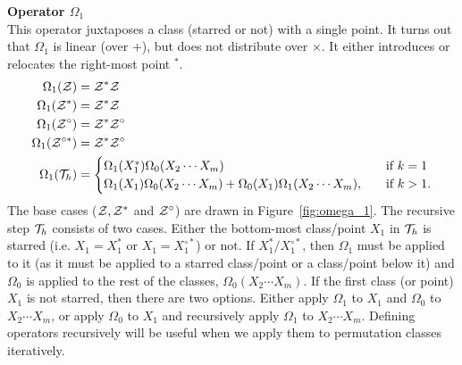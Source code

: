 \documentclass[12pt, a4paper, twoside]{report}
\begin{document}
\noindent\textbf{Operator $\Omega_1$}\\
This operator juxtaposes a class (starred or not) with a single point. It turns out that $\Omega_1$ is linear (over $+$), but does not distribute over $\times$. It either introduces or relocates the right-most point ${}^*$. 
\begin{align}
\begin{aligned}
    \Omega_1(\mathcal{Z}) &= \mathcal{Z}^*\mathcal{Z}\\
    \Omega_1(\mathcal{Z}^*) &= \mathcal{Z}^*\mathcal{Z}\\
    \Omega_1(\mathcal{Z}^\circ) &= \mathcal{Z}^*\mathcal{Z}^\circ\\
    \Omega_1(\mathcal{Z}^{\circ*}) &= \mathcal{Z}^*\mathcal{Z}^\circ\\
  \Omega_1(\mathcal{T}_h) &=
                      \begin{cases}
                        \Omega_1(X_1^*)\Omega_0(X_2\cdots X_m) \quad &\text{if $k = 1$}\\
                        \Omega_1(X_1)\Omega_0(X_2\cdots X_m) + \Omega_0(X_1)\Omega_1(X_2\cdots X_m),\quad &\text{if $k>1$.}
                      \end{cases}
\end{aligned}
\label{eq:iterjuxt_def_omega1}
\end{align}
The base cases ($\mathcal{Z}, \mathcal{Z}^*$ and $\mathcal{Z}^\circ$) are drawn in Figure~\ref{fig:omega_1}. The recursive step $\mathcal{T}_h$ consists of two cases. Either the bottom-most class/point $X_1$ in $\mathcal{T}_h$ is starred (i.e. $X_1 = X_1^*$ or $X_1 = X_1^{\circ*}$) or not. If $X_1^*/X_1^{\circ*}$, then $\Omega_1$ must be applied to it (as it must be applied to a starred class/point or a class/point below it) and $\Omega_0$ is applied to the rest of the classes, $\Omega_0(X_2\cdots X_m)$. If the first class (or point) $X_1$ is not starred, then there are two options. Either apply $\Omega_1$ to $X_1$ and $\Omega_0$ to $X_2\cdots X_m$, or apply $\Omega_0$ to $X_1$ and recursively apply $\Omega_1$ to $X_2\cdots X_m$. Defining operators recursively will be useful when we apply them to permutation classes iteratively.
\end{document}
